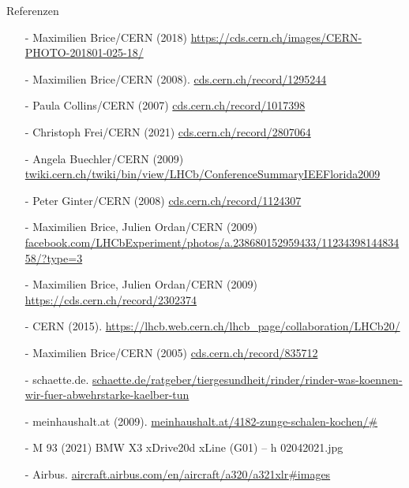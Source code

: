 \begin{frame}{Referenzen}\scriptsize
\begin{itemize}
\item[-] Maximilien Brice/CERN (2018) \url{https://cds.cern.ch/images/CERN-PHOTO-201801-025-18/} 
\item[-] Maximilien Brice/CERN (2008). \url{cds.cern.ch/record/1295244}
\item[-] Paula Collins/CERN (2007)  \url{cds.cern.ch/record/1017398}
\item[-] Christoph Frei/CERN (2021)  \url{cds.cern.ch/record/2807064}
\item[-] Angela Buechler/CERN (2009)  \url{twiki.cern.ch/twiki/bin/view/LHCb/ConferenceSummaryIEEFlorida2009}
\item[-] Peter Ginter/CERN (2008) \url{cds.cern.ch/record/1124307}
\item[-] Maximilien Brice, Julien Ordan/CERN (2009)  \url{facebook.com/LHCbExperiment/photos/a.238680152959433/1123439814483458/?type=3}
\item[-] Maximilien Brice, Julien Ordan/CERN (2009)  \url{https://cds.cern.ch/record/2302374}
\item[-] CERN (2015). \url{https://lhcb.web.cern.ch/lhcb_page/collaboration/LHCb20/ }
\item[-] Maximilien Brice/CERN (2005)  \url{cds.cern.ch/record/835712}
\item[-] schaette.de. \url{schaette.de/ratgeber/tiergesundheit/rinder/rinder-was-koennen-wir-fuer-abwehrstarke-kaelber-tun}
\item[-] meinhaushalt.at (2009). \url{meinhaushalt.at/4182-zunge-schalen-kochen/#}
\item[-] M 93 (2021) BMW X3 xDrive20d xLine (G01) – h 02042021.jpg
\item[-] Airbus. \url{aircraft.airbus.com/en/aircraft/a320/a321xlr#images}

\end{itemize}
\end{frame}
